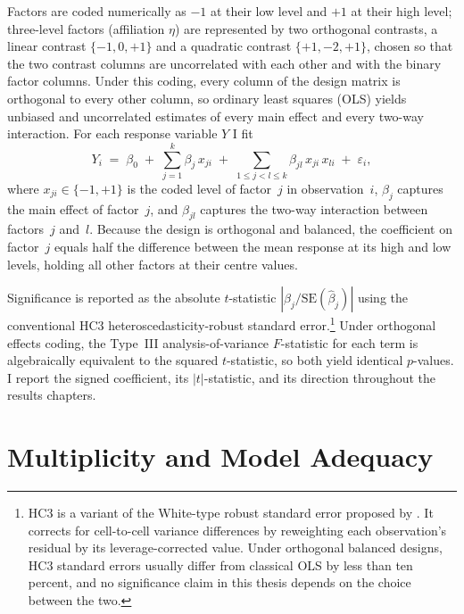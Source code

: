 Factors are coded numerically as $-1$ at their low level and $+1$ at their high level; three-level factors (affiliation $\eta$) are represented by two orthogonal contrasts, a linear contrast $\{-1, 0, +1\}$ and a quadratic contrast $\{+1, -2, +1\}$, chosen so that the two contrast columns are uncorrelated with each other and with the binary factor columns. Under this coding, every column of the design matrix is orthogonal to every other column, so ordinary least squares (OLS) yields unbiased and uncorrelated estimates of every main effect and every two-way interaction. For each response variable $Y$ I fit
\begin{equation}
Y_i \;=\; \beta_0 \;+\; \sum_{j=1}^{k} \beta_j \, x_{ji} \;+\; \sum_{1 \leq j < l \leq k} \beta_{jl} \, x_{ji}\, x_{li} \;+\; \varepsilon_i,
\label{eq:ols}
\end{equation}
where $x_{ji} \in \{-1, +1\}$ is the coded level of factor~$j$ in observation~$i$, $\beta_j$ captures the main effect of factor~$j$, and $\beta_{jl}$ captures the two-way interaction between factors~$j$ and~$l$. Because the design is orthogonal and balanced, the coefficient on factor~$j$ equals half the difference between the mean response at its high and low levels, holding all other factors at their centre values.

Significance is reported as the absolute $t$-statistic $|\hat{\beta}_j / \mathrm{SE}(\hat{\beta}_j)|$ using the conventional HC3 heteroscedasticity-robust standard error.\footnote{HC3 is a variant of the White-type robust standard error proposed by \citet{MacKinnonWhite1985}. It corrects for cell-to-cell variance differences by reweighting each observation's residual by its leverage-corrected value. Under orthogonal balanced designs, HC3 standard errors usually differ from classical OLS by less than ten percent, and no significance claim in this thesis depends on the choice between the two.} Under orthogonal effects coding, the Type~III analysis-of-variance $F$-statistic for each term is algebraically equivalent to the squared $t$-statistic, so both yield identical $p$-values. I report the signed coefficient, its $|t|$-statistic, and its direction throughout the results chapters.

\section{Multiplicity and Model Adequacy}
\label{sec:multiplicity_main}

